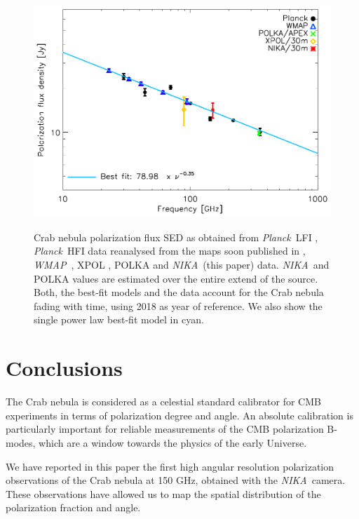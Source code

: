 \documentclass[twocolumn,traditabstract]{aa}
\def\NIKA{\textit{NIKA}}
\def\Planck{\textit{Planck}}
\def\WMAP{\textit{WMAP}}
\begin{document}
\begin{figure}
  \centering
             { \includegraphics[width=1\linewidth,keepaspectratio]{figures/Crab_SED_ipol.pdf}}
           \caption{Crab nebula polarization flux SED as obtained from \Planck\ LFI \citep{2015arXiv150702058P}, \Planck\ HFI data reanalysed from the maps soon published in \cite{planck2018}, \WMAP\ \citep{2011ApJS..192...19W}, XPOL \citep{aumont2010}, POLKA \citep{2014PASP..126.1027W} and \NIKA\ (this paper) data. \NIKA\ and POLKA values are estimated over the entire extend of the source. Both, the best-fit models and the data account for the Crab nebula fading with time, using 2018 as year of reference. We also show the single power law best-fit model in cyan.}
\label{crab_SED_ipol}		
  \end{figure} 
 \noindent


\section{Conclusions}\label{sec:conclusions}
The Crab nebula is considered as a celestial standard calibrator for CMB experiments in
terms of polarization degree and angle. An absolute calibration is
particularly important for reliable measurements of the CMB polarization B-modes,
which are a window towards the physics of the early Universe.

We have reported in this paper the first high angular resolution polarization observations of the Crab nebula at 150 GHz, obtained with the \NIKA\ camera. These observations have
allowed us to map the spatial distribution of the polarization
fraction and angle.  
\end{document}
